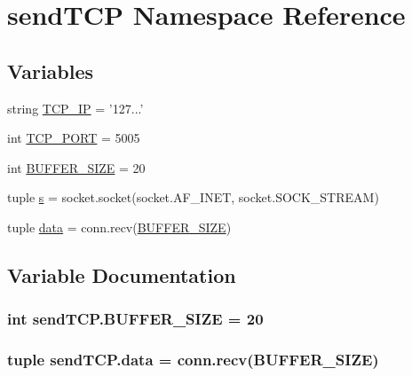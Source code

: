 \hypertarget{namespacesendTCP}{}\section{send\+T\+C\+P Namespace Reference}
\label{namespacesendTCP}
\subsection*{Variables}
\begin{DoxyCompactItemize}
\item 
string \hyperlink{namespacesendTCP_a05a250bce739d0837d68cf4ee2493081}{T\+C\+P\+\_\+\+I\+P} = '127...'
\item 
int \hyperlink{namespacesendTCP_a2fb17394c40ece35f8159663669141ab}{T\+C\+P\+\_\+\+P\+O\+R\+T} = 5005
\item 
int \hyperlink{namespacesendTCP_aae5278c61bd69966fd39810dd25d66a7}{B\+U\+F\+F\+E\+R\+\_\+\+S\+I\+Z\+E} = 20
\item 
tuple \hyperlink{namespacesendTCP_a5755bd39fa2a044b677c3f2503d4ab21}{s} = socket.\+socket(socket.\+A\+F\+\_\+\+I\+N\+E\+T, socket.\+S\+O\+C\+K\+\_\+\+S\+T\+R\+E\+A\+M)
\item 
tuple \hyperlink{namespacesendTCP_aab2480871ae151270c83e7ac757b1bcb}{data} = conn.\+recv(\hyperlink{namespacesendTCP_aae5278c61bd69966fd39810dd25d66a7}{B\+U\+F\+F\+E\+R\+\_\+\+S\+I\+Z\+E})
\end{DoxyCompactItemize}


\subsection{Variable Documentation}
\hypertarget{namespacesendTCP_aae5278c61bd69966fd39810dd25d66a7}{}
\subsubsection[{B\+U\+F\+F\+E\+R\+\_\+\+S\+I\+Z\+E}]{\setlength{\rightskip}{0pt plus 5cm}int send\+T\+C\+P.\+B\+U\+F\+F\+E\+R\+\_\+\+S\+I\+Z\+E = 20}\label{namespacesendTCP_aae5278c61bd69966fd39810dd25d66a7}
\hypertarget{namespacesendTCP_aab2480871ae151270c83e7ac757b1bcb}{}
\subsubsection[{data}]{\setlength{\rightskip}{0pt plus 5cm}tuple send\+T\+C\+P.\+data = conn.\+recv({\bf B\+U\+F\+F\+E\+R\+\_\+\+S\+I\+Z\+E})}\label{namespacesendTCP_aab2480871ae151270c83e7ac757b1bcb}
\hypertarget{namespacesendTCP_a5755bd39fa2a044b677c3f2503d4ab21}{}
